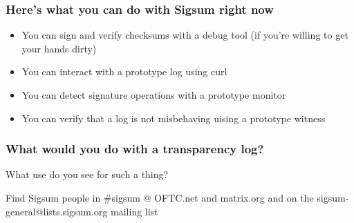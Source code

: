 \begin{frame}
  \frametitle{Here's what you can do with Sigsum right now}

  \begin{itemize}
  \item<1-> You can sign and verify checksums with a debug tool (if
    you’re willing to get your hands dirty)
  \item<2-> You can interact with a prototype log using curl
  \item<3-> You can detect signature operations with a prototype
    monitor
  \item<4-> You can verify that a log is not misbehaving uising a
    prototype witness
  \end{itemize}
\end{frame}

\begin{frame}
  \frametitle{What would you do with a transparency log?}

  What use do you see for such a thing?
  \pause

  Find Sigsum people in \#sigsum @ OFTC.net and matrix.org and on the
  sigsum-general@lists.sigsum.org mailing list
\end{frame}
